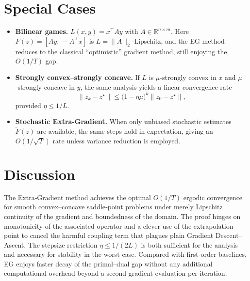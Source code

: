 \documentclass{article}
\newcommand{\R}{\mathbb{R}}
\begin{document}
\section*{Special Cases}
\begin{itemize}
\item \textbf{Bilinear games.} $L(x,y)=x^{\top}Ay$ with $A\in\R^{n\times m}$. Here $F(z)=[Ay;\,-A^{\top}x]$ is $L=\|A\|_{2}$‑Lipschitz, and the EG method reduces to the classical “optimistic” gradient method, still enjoying the $O(1/T)$ gap.
\item \textbf{Strongly convex–strongly concave.} If $L$ is $\mu$‑strongly convex in $x$ and $\mu$‑strongly concave in $y$, the same analysis yields a linear convergence rate
\[
\|z_{k}-z^{\star}\|\le\bigl(1-\eta\mu\bigr)^{k}\|z_{0}-z^{\star}\|,
\]
provided $\eta\le 1/L$.
\item \textbf{Stochastic Extra‑Gradient.} When only unbiased stochastic estimates $\tilde F(z)$ are available, the same steps hold in expectation, giving an $O(1/\sqrt{T})$ rate unless variance reduction is employed.
\end{itemize}

\section*{Discussion}
The Extra‑Gradient method achieves the optimal $O(1/T)$ ergodic convergence for smooth convex–concave saddle‑point problems under merely Lipschitz continuity of the gradient and boundedness of the domain. The proof hinges on monotonicity of the associated operator and a clever use of the extrapolation point to cancel the harmful coupling term that plagues plain Gradient Descent–Ascent. The stepsize restriction $\eta\le1/(2L)$ is both sufficient for the analysis and necessary for stability in the worst case. Compared with first‑order baselines, EG enjoys faster decay of the primal–dual gap without any additional computational overhead beyond a second gradient evaluation per iteration.
\end{document}
